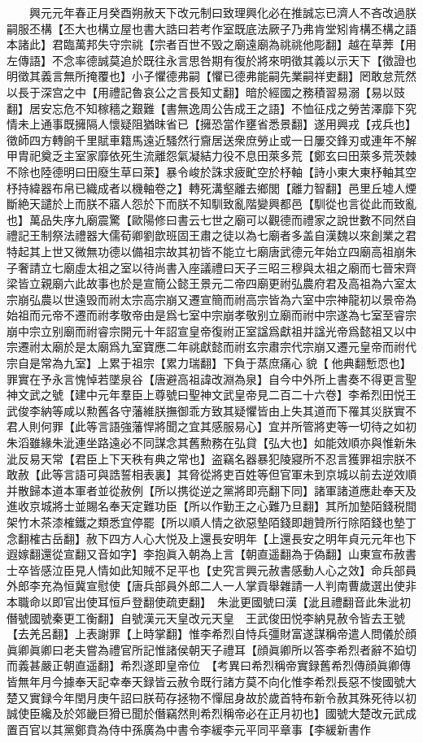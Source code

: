 　　興元元年春正月癸酉朔赦天下改元制曰致理興化必在推誠忘已濟人不吝改過朕嗣服丕構【丕大也構立屋也書大誥曰若考作室既底法厥子乃弗肯堂矧肯構丕構之語本諸此】君臨萬邦失守宗祧【宗者百世不毁之廟遠廟為祧祧他彫翻】越在草莾【用左傳語】不念率德誠莫追於既往永言思咎期有復於將來明徵其義以示天下【徵證也明徵其義言無所掩覆也】小子懼德弗嗣【懼已德弗能嗣先業嗣祥吏翻】罔敢怠荒然以長于深宫之中【用禮記魯哀公之言長知丈翻】暗於經國之務積習易溺【易以豉翻】居安忘危不知稼穡之艱難【書無逸周公告成王之語】不恤征戍之勞苦澤靡下究情未上通事既擁隔人懷疑阻猶昩省已【擁恐當作壅省悉景翻】遂用興戎【戎兵也】徵師四方轉餉千里賦車籍馬遠近騷然行齎居送衆庶勞止或一日屢交鋒刃或連年不解甲胄祀奠乏主室家靡依死生流離怨氣凝結力役不息田萊多荒【鄭玄曰田萊多荒茨棘不除也陸德明曰田廢生草曰萊】暴令峻於誅求疲甿空於杼軸【詩小東大東杼軸其空杼持緯器布帛已織成者以機軸卷之】轉死溝壑離去鄉閭【離力智翻】邑里丘墟人煙斷絶天譴於上而朕不寤人怨於下而朕不知馴致亂階變興都邑【馴從也言從此而致亂也】萬品失序九廟震驚【歐陽修曰書云七世之廟可以觀德而禮家之說世數不同然自禮記王制祭法禮器大儒荀卿劉歆班固王肅之徒以為七廟者多盖自漢魏以來創業之君特起其上世又微無功德以備祖宗故其初皆不能立七廟唐武德元年始立四廟高祖崩朱子奢請立七廟虛太祖之室以待尚書入座議禮曰天子三昭三穆與太祖之廟而七晉宋齊梁皆立親廟六此故事也於是宣簡公懿王景元二帝四廟更祔弘農府君及高祖為六室太宗崩弘農以世遠毁而祔太宗高宗崩又遷宣簡而祔高宗皆為六室中宗神龍初以景帝為始祖而元帝不遷而祔孝敬帝由是爲七室中宗崩孝敬别立廟而祔中宗遂為七室至睿宗崩中宗立别廟而祔睿宗開元十年詔宣皇帝復祔正室諡爲獻祖并諡光帝爲懿祖又以中宗遷祔太廟於是太廟爲九室寶應二年祧獻懿而祔玄宗肅宗代宗崩又遷元皇帝而祔代宗自是常為九室】上累于祖宗【累力瑞翻】下負于蒸庶痛心貌【他典翻慙恧也】罪實在予永言愧悼若墜泉谷【唐避高祖諱改淵為泉】自今中外所上書奏不得更言聖神文武之號【建中元年羣臣上尊號曰聖神文武皇帝見二百二十六卷】李希烈田悦王武俊李納等咸以勲舊各守藩維朕撫御乖方致其疑懼皆由上失其道而下罹其災朕實不君人則何罪【此等言語強藩悍將聞之宜其感服易心】宜并所管將吏等一切待之如初朱滔雖緣朱泚連坐路遠必不同謀念其舊勲務在弘貸【弘大也】如能效順亦與惟新朱泚反易天常【君臣上下天秩有典之常也】盗竊名器暴犯陵寢所不忍言獲罪祖宗朕不敢赦【此等言語可與誥誓相表裏】其脅從將吏百姓等但官軍未到京城以前去逆效順并散歸本道本軍者並從赦例【所以携從逆之黨將即亮翻下同】諸軍諸道應赴奉天及進收京城將士並賜名奉天定難功臣【所以作勤王之心難乃旦翻】其所加墊陌錢税間架竹木茶漆榷鐵之類悉宜停罷【所以順人情之欲惡墊陌錢即趙贊所行除陌錢也墊丁念翻榷古岳翻】赦下四方人心大悦及上還長安明年【上還長安之明年貞元元年也下遐嫁翻還從宣翻又音如字】李抱眞入朝為上言【朝直遥翻為于偽翻】山東宣布赦書士卒皆感泣臣見人情如此知賊不足平也【史究言興元赦書感動人心之效】命兵部員外郎李充為恒冀宣慰使【唐兵部員外郎二人一人掌貢舉雜請一人判南曹歲選出使非本職命以即官出使耳恒戶登翻使疏吏翻】　朱泚更國號曰漢【泚且禮翻音此朱泚初僭號國號秦更工衡翻】自號漢元天皇改元天皇　王武俊田悦李納見赦令皆去王號【去羌呂翻】上表謝罪【上時掌翻】惟李希烈自恃兵彊財富遂謀稱帝遣人問儀於顔眞卿眞卿曰老夫嘗為禮官所記惟諸侯朝天子禮耳【顔眞卿所以答李希烈者辭不廹切而義甚嚴正朝直遥翻】希烈遂即皇帝位　【考異曰希烈稱帝實録舊希烈傳顔眞卿傳皆無年月今據奉天記幸奉天録皆云赦令既行諸方莫不向化惟李希烈長惡不悛國號大楚又實録今年閏月庚午詔曰朕苟存拯物不憚屈身故於歲首特布新令赦其殊死待以初誠使臣纔及於郊畿巨猾已聞於僭竊然則希烈稱帝必在正月初也】國號大楚改元武成置百官以其黨鄭賁為侍中孫廣為中書令李緩李元平同平章事【李緩新書作